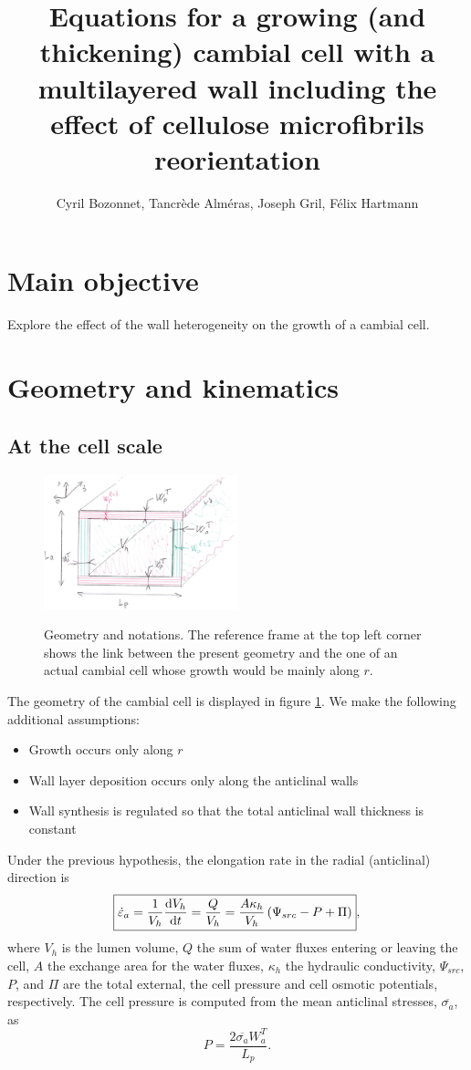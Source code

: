 \documentclass[]{article}
\title{Equations for a growing (and thickening) cambial cell with a multilayered wall including the effect of cellulose microfibrils reorientation}
\author{Cyril Bozonnet, Tancrède Alméras, Joseph Gril, Félix Hartmann}
\begin{document}
	
	\maketitle
	\section{Main objective}
Explore the effect  of the wall heterogeneity on the growth of a cambial cell.
	
	\section{Geometry and kinematics}
	\subsection{At the cell scale}
	\begin{figure}[h]
		\centering
		{\includegraphics[width=0.5\textwidth]{schema.png}}
		\caption{Geometry and notations. The reference frame at the top left corner shows the link between the present geometry and the one of an actual cambial cell whose growth would be mainly along $r$.}
		\label{fig1}
	\end{figure}
	The geometry of the cambial cell is displayed in figure \ref{fig1}. 
	We make the following additional assumptions:
	\begin{itemize}
		\item Growth occurs only along $r$
		\item Wall layer deposition occurs only along the anticlinal walls
		\item Wall synthesis is regulated so that the total anticlinal wall thickness is constant
	\end{itemize}
Under the previous hypothesis, the elongation rate in the radial (anticlinal) direction is
\begin{equation}\label{ER}
	\boxed{
	\dot{\varepsilon}_a = \frac{1}{V_h}\frac{{\rm d} V_h}{{\rm d} t} =  \frac{Q}{V_h} = \frac{A \kappa_h}{V_h}\left(\Psi_{src} -P + \Pi \right)},
\end{equation}
where $V_h$ is the lumen volume, $Q$ the sum of water fluxes entering or leaving the cell, $A$ the exchange area for the water fluxes, $\kappa_h$ the hydraulic conductivity, $\Psi_{src}$, $P$, and $\Pi$ are the total external, the cell pressure and cell osmotic potentials, respectively. The cell pressure is computed from the mean anticlinal stresses, $\overline{\sigma_a}$, as
\begin{equation}
	P=\frac{2\overline{\sigma_a}W_a^T}{L_p}.
\end{equation}
\end{document}
